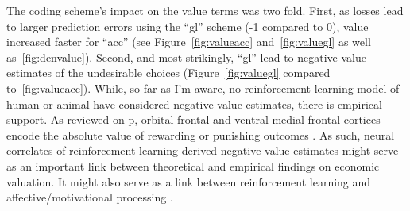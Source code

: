 \documentclass[doc,12pt]{apa}        %
\begin{document}
The coding scheme's impact on the value terms was two fold.  First, as losses lead to larger prediction errors using the ``gl'' scheme (-1 compared to 0), value increased faster for ``acc'' (see Figure~\ref{fig:valueacc} and~\ref{fig:valuegl} as well as~\ref{fig:denvalue}).  Second, and most strikingly, ``gl'' lead to negative value estimates of the undesirable choices (Figure~\ref{fig:valuegl} compared to~\ref{fig:valueacc}).  While, so far as I'm aware, no reinforcement learning model of human or animal have considered negative value estimates, there is empirical support.  As reviewed on p\pageref{subsub:fclt}, orbital frontal and ventral medial frontal cortices encode the absolute value of rewarding or punishing outcomes \cite{ODoherty:2001p2423,Hornak:2004p6234}.  As such, neural correlates of reinforcement learning derived negative value estimates might serve as an important link between theoretical and empirical findings on economic valuation.  It might also serve as a link between reinforcement learning and affective/motivational processing \cite{Knutson:2005p1627,Delgado:2004p6665}.
\end{document}
